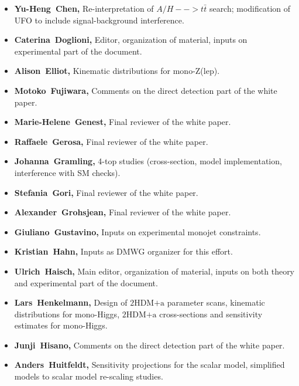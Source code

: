 \documentclass[a4paper, 11pt,notoc]{article}
\newcommand{\hdma}{\ensuremath{\textrm{2HDM+a}}\xspace}
\begin{document}
\begin{itemize}
\item \textbf{Yu-Heng~Chen,} Re-interpretation of $A/H-->t\bar{t}$ search; modification of UFO to include signal-background interference.

\item \textbf{Caterina~Doglioni,} Editor, organization of material, inputs on experimental part of the document. 

\item \textbf{Alison~Elliot,} Kinematic distributions for mono-Z(lep). 

\item \textbf{Motoko~Fujiwara,} Comments on the direct detection part of the white paper. 

\item \textbf{Marie-Helene~Genest,} Final reviewer of the white paper. 

\item \textbf{Raffaele~Gerosa,} Final reviewer of the white paper. 

\item \textbf{Johanna~Gramling,} 4-top studies (cross-section, model implementation, interference with SM checks).

\item \textbf{Stefania~Gori,} Final reviewer of the white paper. 

\item \textbf{Alexander~Grohsjean,} Final reviewer of the white paper. 

\item \textbf{Giuliano~Gustavino,} Inputs on experimental monojet constraints. 

\item \textbf{Kristian~Hahn,} Inputs as DMWG organizer for this effort. 

\item \textbf{Ulrich~Haisch,} Main editor, organization of material, inputs on both theory and experimental part of the document. 
 
\item \textbf{Lars~Henkelmann,} Design of \hdma parameter scans,  kinematic distributions for mono-Higgs, \hdma cross-sections and sensitivity estimates for mono-Higgs.

\item \textbf{Junji~Hisano,} Comments on the direct detection part of the white paper. 

\item \textbf{Anders~Huitfeldt,} Sensitivity projections for the scalar model, simplified models to scalar model re-scaling studies. 


\end{itemize}
\end{document}
